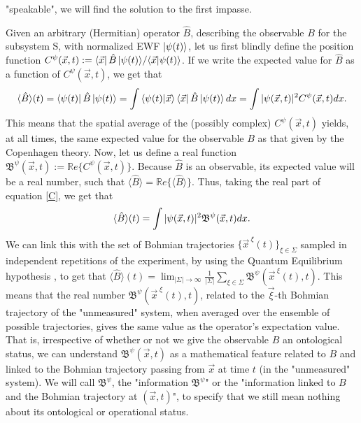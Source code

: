 \documentclass[11pt, a4paper]{article} %
\newcommand{\B}{\mathfrak{B}}
\begin{document}
"speakable", we will find the solution to the first impasse.

Given an arbitrary (Hermitian) operator $\hat{B}$, describing the observable $B$ for the subsystem S, with normalized EWF $\ket{\psi(t)}$, let us first blindly define the position function $C^{\psi}(\vec{x},t):={\bra{\vec{x}}\hat{B}\ket{\psi(t)}}/{\bra{\vec{x}}\ket{\psi(t)}}$. If we write the expected value for $\hat{B}$ as a function of $C^\psi(\vec{x},t)$, we get that\vspace{-0.15cm}
\begin{equation}\label{C}
\langle \hat{B}\rangle(t)= \bra{\psi(t)}\hat{B}\ket{\psi(t)}=\int \bra{\psi(t)} \ket{\vec{x}}\bra{\vec{x}}\hat{B}\ket{\psi(t)}dx =  \int |\psi(\vec{x},t)|^2C^\psi(\vec{x},t)dx.\vspace{-0.1cm}
\end{equation}
This means that the spatial average of the (possibly complex) $C^\psi(\vec{x},t)$ yields, at all times, the same expected value for the observable $B$ as that given by the Copenhagen theory. Now, let us define a real function $\B^\psi(\vec{x},t):=\mathbb{R}e\{C^{\psi}(\vec{x},t)\}$. Because $\hat{B}$ is an observable, its expected value will be a real number, such that $\langle \hat{B}\rangle=\mathbb{R}e\{\langle \hat{B}\rangle\}$. Thus, taking the real part of equation \eqref{C}, we get that\vspace{-0.1cm}
\begin{equation}
\langle \hat{B}\rangle(t)=\int |\psi(\vec{x},t)|^2\B^\psi(\vec{x},t)dx.\vspace{-0.1cm}
\end{equation}
We can link this with the set of Bohmian trajectories $\{\vec{x}^{\:\xi}(t)\}_{\xi\in\Sigma}$ sampled in independent repetitions of the experiment, by
using the Quantum Equilibrium hypothesis \cite{Absolute}, to get that $\langle \hat{B}\rangle(t)=\lim_{|\Sigma|\rightarrow \infty}\frac{1}{|\Sigma|} \sum_{\xi\in\Sigma} \B^\psi(\vec{x}^{\:\xi}(t),t)$. This means that the real number $\B^\psi(\vec{x}^{\;\xi}(t),t)$, related to the $\vec{\xi}$-th Bohmian trajectory of the "unmeasured" system, when averaged over the ensemble of possible trajectories, gives the same value as the operator's expectation value. That is, irrespective of whether or not we give the observable $B$ an ontological status, we can understand $\B^\psi(\vec{x},t)$ as a mathematical feature related to $B$ and linked to the Bohmian trajectory passing from $\vec{x}$ at time $t$ (in the "unmeasured" system). We will call $\B^\psi$, the "information $\B^\psi$" or the "information linked to $B$ and the Bohmian trajectory at $(\vec{x},t)$", to specify that we still mean nothing about its ontological or operational status.
\end{document}
